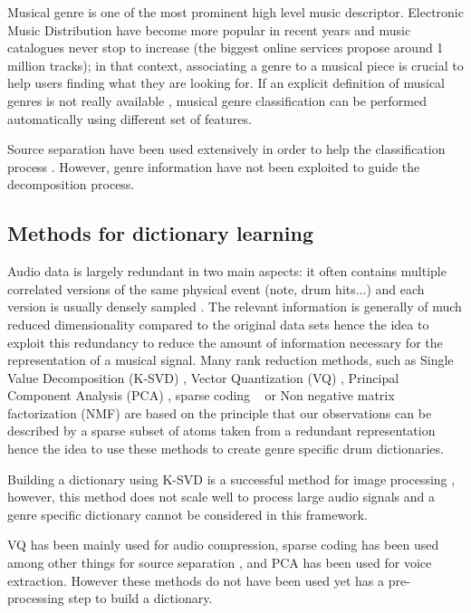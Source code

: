 \documentclass{article}
\begin{document}
Musical genre is one of the most prominent high level music descriptor. Electronic Music Distribution have become more popular in recent years and music catalogues never stop to increase (the biggest online services propose around 1 million tracks); in that context, associating a genre to a musical piece is crucial to help users finding what they are looking for. If an explicit definition of musical genres is not really available \cite{aucouturier2003representing}, musical genre classification can be performed automatically using different set of features\cite{li2003comparative}. 

Source separation have been used extensively in order to help the classification process \cite{rump2010autoregressive,lampropoulos2005musical}. However, genre information have not been exploited to guide the decomposition process. 


\subsection{Methods for dictionary learning}


Audio data is largely redundant in two main aspects: it often contains multiple correlated versions of the same physical event (note, drum hits...) and each version is usually densely sampled \cite{tovsic2011dictionary}. The relevant information is generally of much reduced dimensionality compared to the original data sets hence the idea to exploit this redundancy to reduce the amount of information necessary for the representation of a musical signal. Many rank reduction methods, such as Single Value Decomposition (K-SVD) \cite{aharon2006img}, Vector Quantization (VQ) \cite{gersho2012vector}, Principal Component Analysis (PCA) \cite{huang2012singing}, sparse coding ~\cite{abdallah2006unsupervised}  or Non negative matrix factorization (NMF) \cite{Smaragdis2003} are based on the principle that our observations can be described by a sparse subset of atoms taken from a redundant representation hence the idea to use these methods to create genre specific drum dictionaries.

Building a dictionary using K-SVD is a successful method for image processing \cite{zhang2010discriminative}, however, this method does not scale well to process large audio signals and a genre specific dictionary cannot be considered in this framework.

VQ has been mainly used for audio compression, sparse coding has been used among other things for source separation \cite{plumbley2010sparse}, and PCA has been used for voice extraction. However these methods do not have been used yet has a pre-processing step to build a dictionary.
\end{document}
